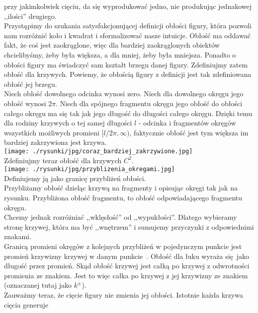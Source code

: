 \documentclass[a4paper, 12pt, twosided]{article}
\newcommand{\rysunek}[1]{\hfill \break\\[16pt] \Huge \textbf{\textcolor{violet}{Brakujący rysunek 
\normalsize
#1}} \hfill
\break \\[16pt] \normalsize}
\begin{document}
przy jakimkolwiek cięciu, da się wyprodukować jedno, nie produkując jednakowej ,,ilości'' drugiego. 
\\[4pt]
Przystąpimy do szukania satysfakcjonującej definicji obłości figury, która pozwoli nam rozróżnić
koło i kwadrat i sformalizować nasze intuicje. Obłość ma oddawać fakt, że coś jest zaokrąglone, 
 więc 
dla bardziej
zaokrąglonych obiektów chcielibyśmy, żeby była większa, a dla mniej, żeby była mniejsza. Ponadto o 
obłości
figury ma świadczyć sam kształt brzegu danej figury. Zdefiniujmy zatem obłość dla krzywych. 
 Powiemy, 
że
obłością figury z definicji jest tak zdefiniowana obłość jej brzegu. \\
Niech obłość dowolnego odcinka wynosi zero. Niech dla dowolnego okręgu jego obłość wynosi 
$2\pi$.
Niech dla spójnego fragmentu okręgu jego obłość do obłości całego okręgu ma się tak jak jego 
 długość 
do
długości całego okręgu. Dzięki temu dla rodziny krzywych o tej samej długości $l$ - odcinka i 
fragmentów
okręgów wszystkich możliwych promieni $[l/2\pi, \infty)$, faktycznie obłość jest tym większa im 
bardziej
zakrzywiona jest krzywa. \\
\texttt{[image: ./rysunki/jpg/coraz\_bardziej\_zakrzywione.jpg]} \\
Zdefiniujmy teraz obłość dla krzywych $C^2$. \\
\texttt{[image: ./rysunki/jpg/przyblizenia\_okregami.jpg]} \\
Definiujemy ją jako granicę przybliżeń obłości. \\
Przybliżamy obłość dzieląc krzywą na fragmenty i opisując okręgi tak jak na rysunku. Przybliżona 
obłość
fragmentu, to obłość odpowiadającego fragmentu okręgu. \\
Chcemy jednak rozróżniać ,,wklęsłość'' od ,,wypukłości''. Dlatego wybieramy stronę krzywej, która 
 ma 
być
,,wnętrzem'' i sumujemy przyczynki z odpowiednimi znakami. \\
Granicą promieni okręgów z kolejnych przybliżeń w pojedynczym punkcie jest promień krzywizny 
krzywej w danym 
punkcie~\cite{Spivak}.
Obłość dla łuku wyraża się jako długość przez promień. Skąd obłość krzywej jest całką po krzywej z
odwrotności promienia ze znakiem. Jest to więc całka po krzywej z jej krzywizny ze znakiem 
(oznaczanej
tutaj jako $k^\pm$). \\
Zauważmy teraz, że cięcie figury nie zmienia jej obłości. Istotnie każda krzywa cięcia generuje 
\end{document}
